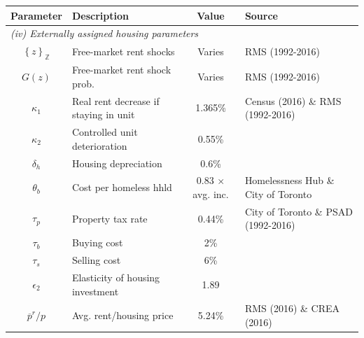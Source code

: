 \begin{table}[p]
\footnotesize
\renewcommand{\arraystretch}{1.2}
\begin{center}
\begin{tabular}{clcl}\toprule
Parameter & Description & Value & Source\\
\midrule
\multicolumn{4}{l}{\textit{(iv) Externally assigned housing parameters}}\\
\midrule
$\left\{z\right\}_{\mathbb{Z}}$ & Free-market rent shocks & Varies & RMS (1992-2016) \\
$G(z)$ & Free-market rent shock prob. & Varies & RMS (1992-2016) \\
$\kappa_{1}$ & Real rent decrease if staying in unit & 1.365\% & Census (2016) \& RMS (1992-2016) \\
$\kappa_{2}$ & Controlled unit deterioration & 0.55\% & \citet{murray_et_al-1991} \\
$\delta_h$ & Housing depreciation & 0.6\% & \citet{rosenthal-2014} \\
$\theta_{b}$ & Cost per homeless hhld & 0.83 $\times$ avg. inc. & Homelessness Hub \& City of Toronto\\
$\tau_p$ & Property tax rate & 0.44\% & City of Toronto \& PSAD (1992-2016) \\
$\tau_{b}$ & Buying cost & 2\% & \citet{gm-2003} \\
$\tau_{s}$ & Selling cost & 6\% & \citet{gm-2003} \\
$\epsilon_2$ & Elasticity of housing investment & 1.89 & \citet{piaxao-2021} \\
$\overline{p}^{r}/p$ & Avg. rent/housing price & 5.24\% & RMS (2016) \& CREA (2016) \\
\bottomrule
\bottomrule
\end{tabular}
\end{center}
\normalsize
\end{table}
